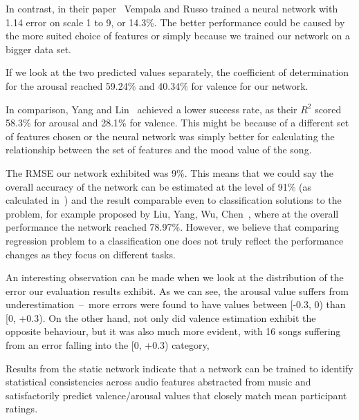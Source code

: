 In contrast, in their paper~\cite{vempala} Vempala and Russo trained a neural network with 1.14 error on scale 1 to 9, or 14.3\%. The better performance could be caused by the more suited choice of features or simply because we trained our network on a bigger data set.

If we look at the two predicted values separately, the coefficient of determination for the arousal reached 59.24\% and 40.34\% for valence for our network.

In comparison, Yang and Lin~\cite{mood} achieved a lower success rate, as their $R^2$ scored 58.3\% for arousal and 28.1\% for valence. This might be because of a different set of features chosen or the neural network was simply better for calculating the relationship between the set of features and the mood value of the song.

The RMSE our network exhibited was 9\%. This means that we could say the overall accuracy of the network can be estimated at the level of 91\% (as calculated in~\cite{vempala}) and the result comparable even to classification solutions to the problem, for example proposed by Liu, Yang, Wu, Chen~\cite{moodclass}, where at the overall performance the network reached 78.97\%. However, we believe that comparing regression problem to a classification one does not truly reflect the performance changes as they focus on different tasks. 

An interesting observation can be made when we look at the distribution of the error our evaluation results exhibit. As we can see, the arousal value suffers from underestimation~--~more errors were found to have values between [-0.3, 0) than [0, +0.3). On the other hand, not only did valence estimation exhibit the opposite behaviour, but it was also much more evident, with 16 songs suffering from an error falling into the [0, +0.3) category,

Results from the static network indicate that a network can be trained to identify statistical consistencies across audio features abstracted from music and satisfactorily predict valence/arousal values that closely match mean participant ratings.



